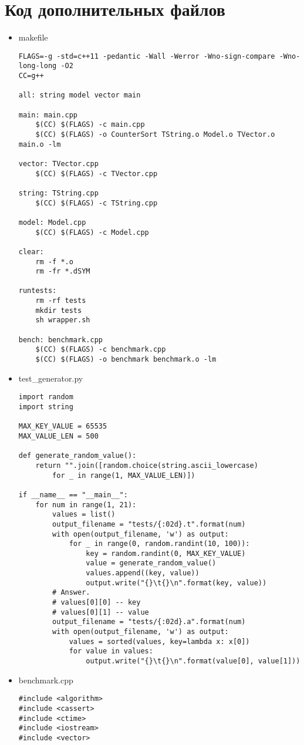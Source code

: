 \documentclass[pdf, unicode, 12pt, a4paper,oneside,fleqn]{article}
\begin{document}
\section{Код дополнительных файлов}
\lstset{language=BASH}
\begin{itemize}
\item makefile
\begin{lstlisting}
FLAGS=-g -std=c++11 -pedantic -Wall -Werror -Wno-sign-compare -Wno-long-long -O2
CC=g++

all: string model vector main

main: main.cpp
	$(CC) $(FLAGS) -c main.cpp
	$(CC) $(FLAGS) -o CounterSort TString.o Model.o TVector.o main.o -lm

vector: TVector.cpp
	$(CC) $(FLAGS) -c TVector.cpp

string: TString.cpp
	$(CC) $(FLAGS) -c TString.cpp

model: Model.cpp
	$(CC) $(FLAGS) -c Model.cpp
	
clear:
	rm -f *.o
	rm -fr *.dSYM

runtests:
	rm -rf tests
	mkdir tests
	sh wrapper.sh

bench: benchmark.cpp
	$(CC) $(FLAGS) -c benchmark.cpp
	$(CC) $(FLAGS) -o benchmark benchmark.o -lm	
\end{lstlisting}
\item test\_generator.py
\lstset{language=Python}
\begin{lstlisting}
import random
import string

MAX_KEY_VALUE = 65535
MAX_VALUE_LEN = 500

def generate_random_value():
    return "".join([random.choice(string.ascii_lowercase) 
    	for _ in range(1, MAX_VALUE_LEN)])

if __name__ == "__main__":
    for num in range(1, 21):
        values = list()
        output_filename = "tests/{:02d}.t".format(num)
        with open(output_filename, 'w') as output:
            for _ in range(0, random.randint(10, 100)):
                key = random.randint(0, MAX_KEY_VALUE)
                value = generate_random_value()
                values.append((key, value))
                output.write("{}\t{}\n".format(key, value))
        # Answer.
        # values[0][0] -- key
        # values[0][1] -- value
        output_filename = "tests/{:02d}.a".format(num)
        with open(output_filename, 'w') as output:
            values = sorted(values, key=lambda x: x[0])
            for value in values:
                output.write("{}\t{}\n".format(value[0], value[1]))
\end{lstlisting}
\item benchmark.cpp
\lstset{language=C}
\begin{lstlisting}
#include <algorithm>
#include <cassert>
#include <ctime>
#include <iostream>
#include <vector>


\end{lstlisting}
\end{itemize}
\end{document}
